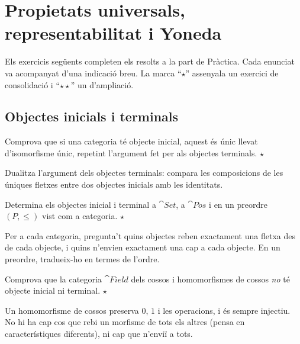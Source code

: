 \chapter[Representabilitat i Yoneda]{\texorpdfstring{Propietats universals,\\ representabilitat i Yoneda}{Propietats universals, representabilitat i Yoneda}}

Els exercicis següents completen els resolts a la part de Pràctica. Cada enunciat va acompanyat d'una indicació breu. La marca \enquote{$\star$} assenyala un exercici de consolidació i \enquote{$\star\star$} un d'ampliació.

\section{Objectes inicials i terminals}

\begin{exercici}
Comprova que si una categoria té objecte inicial, aquest és únic llevat d'isomorfisme únic, repetint l'argument fet per als objectes terminals. \hfill{\normalfont$\star$}
\begin{indicacio}
Dualitza l'argument dels objectes terminals: compara les composicions de les úniques fletxes entre dos objectes inicials amb les identitats.
\end{indicacio}
\end{exercici}

\begin{exercici}
Determina els objectes inicial i terminal a $\cat{Set}$, a $\cat{Pos}$ i en un preordre $(P,\leq)$ vist com a categoria. \hfill{\normalfont$\star$}
\begin{indicacio}
Per a cada categoria, pregunta't quins objectes reben exactament una fletxa des de cada objecte, i quins n'envien exactament una cap a cada objecte. En un preordre, tradueix-ho en termes de l'ordre.
\end{indicacio}
\end{exercici}

\begin{exercici}
Comprova que la categoria $\cat{Field}$ dels cossos i homomorfismes de cossos \emph{no} té objecte inicial ni terminal. \hfill{\normalfont$\star$}
\begin{indicacio}
Un homomorfisme de cossos preserva $0$, $1$ i les operacions, i és sempre injectiu. No hi ha cap cos que rebi un morfisme de tots els altres (pensa en característiques diferents), ni cap que n'enviï a tots.
\end{indicacio}
\end{exercici}

